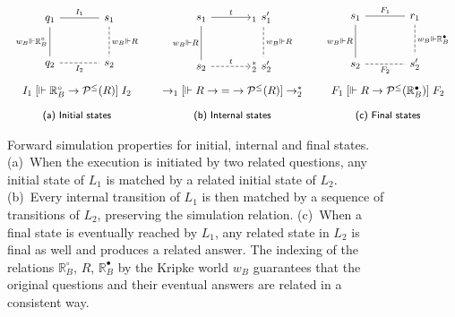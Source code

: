 \documentclass[acmsmall,screen,review,anonymous]{acmart}
\newcommand{\ifr}[1]{\mathrel{[{#1}]}}
\newcommand{\que}{\circ}
\newcommand{\ans}{\bullet}
\begin{document}
\begin{figure} %
  \[
    \begin{array}{c@{\qquad}c@{\qquad}c}
      \begin{tikzcd}[sep=large]
        q_1 \ar[d, "w_B \Vdash \mathbb{R}_B^\que"', dash] \ar[r, dash, "I_1"] &
        s_1 \ar[d, "w_B \Vdash R", dash, dashed] \\
        q_2 \ar[r, "I_2"', dash, dashed] &
        s_2
      \end{tikzcd}
      &
      \begin{tikzcd}[sep=large]
        s_1 \ar[r, "t"] \ar[d, "w_B \Vdash R"', dash] &
        \!\!{}_1 \:\, s_1' \ar[d, "w_B \Vdash R", dash, dashed] \\
        s_2 \ar[r, "t", dashed] &
        \!\!{}_2^* \:\, s_2'
      \end{tikzcd}
      &
      \begin{tikzcd}[sep=large]
        s_1 \ar[r, "F_1", dash] \ar[d, "w_B \Vdash R"', dash] &
        r_1 \ar[d, "w_B \Vdash \mathbb{R}_B^\ans", dash, dashed] \\
        s_2 \ar[r, "F_2"', dash, dashed] &
        s_2'
      \end{tikzcd}
      \\[3.5em]
      I_1 \ifr{\Vdash \mathbb{R}_B^\que \rightarrow \mathcal{P}^\le(R)} I_2
      &
      {\rightarrow_1}
      \ifr{\Vdash R \rightarrow {=} \rightarrow \mathcal{P}^\le(R)}
      {\rightarrow_2^*}
      &
      F_1
      \ifr{\Vdash R \rightarrow \mathcal{P}^\le(\mathbb{R}_B^\ans)}
      F_2
      \\[1em]
      \small \textsf{(a) Initial states} &
      \small \textsf{(b) Internal states} &
      \small \textsf{(c) Final states}
    \end{array}
  \]
  \caption{Forward simulation properties for initial, internal and final states.
    (a)~When the execution is initiated by two related questions,
    any initial state of $L_1$ is matched by
    a related initial state of $L_2$.
    (b)~Every internal transition of $L_1$ is then matched by
    a sequence of transitions of $L_2$,
    preserving the simulation relation.
    (c)~When a final state is eventually reached by $L_1$,
    any related state in $L_2$ is final as well and
    produces a related answer.
    The indexing of the relations
    $\mathbb{R}_B^\que$, $R$, $\mathbb{R}_B^\ans$
    by the Kripke world $w_B$
    guarantees that the original questions and their eventual answers
    are related in a consistent way.}
  \label{fig:fsim}
\end{figure}
\end{document}
